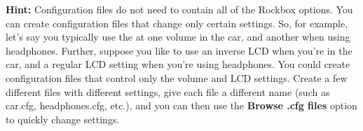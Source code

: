 \begin{itemize}
\begin{itemize}
			\textbf{Hint:  }Configuration files do not need to contain all of the Rockbox options.  You can create configuration files that change only certain settings. So, for example, let's say you typically use the \dap at one volume in the car, and another when using headphones.  Further, suppose you like to use an inverse LCD when you're in the car, and a regular LCD setting when you're using headphones.  You could create configuration files that control only the volume and LCD settings. Create a few different files with different settings, give each file a different name (such as car.cfg, headphones.cfg, etc.), and you can then use the \textbf{Browse .cfg files} option to quickly change settings.
    \end{itemize}
    
  \end{itemize}
